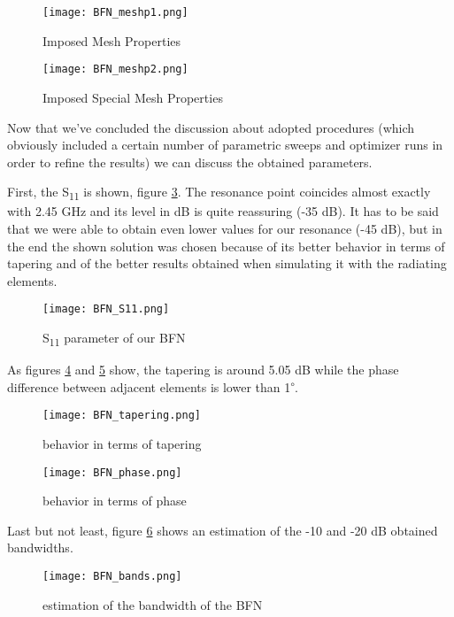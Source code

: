 \begin{figure}[H]
\centering
\texttt{[image: BFN\_meshp1.png]}
\caption{Imposed Mesh Properties}
\label{BFN_meshp1}
\end{figure}

\begin{figure}[H]
\centering
\texttt{[image: BFN\_meshp2.png]}
\caption{Imposed Special Mesh Properties}
\label{BFN_meshp2}
\end{figure}

\par\medskip
\noindent
Now that we've concluded the discussion about adopted procedures (which obviously included a certain number of parametric sweeps and optimizer runs in order to refine the results) we can discuss the obtained parameters.

\par\medskip
\noindent
First, the S\textsubscript{11} is shown, figure \ref{BFN_S11}. The resonance point coincides almost exactly with 2.45 GHz and its level in dB is quite reassuring (-35 dB). It has to be said that we were able to obtain even lower values for our resonance (-45 dB), but in the end the shown solution was chosen because of its better behavior in terms of tapering and of the better results obtained when simulating it with the radiating elements.

\begin{figure}[H]
\centering
\texttt{[image: BFN\_S11.png]}
\caption{S\textsubscript{11} parameter of our BFN}
\label{BFN_S11}
\end{figure}

\par\medskip
\noindent
As figures \ref{BFN_tapering} and \ref{BFN_phase} show, the tapering is around 5.05 dB while the phase difference between adjacent elements is lower than 1\textsuperscript{$\circ$}.

\begin{figure}[H]
\centering
\texttt{[image: BFN\_tapering.png]}
\caption{behavior in terms of tapering}
\label{BFN_tapering}
\end{figure}

\begin{figure}[H]
\centering
\texttt{[image: BFN\_phase.png]}
\caption{behavior in terms of phase}
\label{BFN_phase}
\end{figure}

\par\medskip
\noindent
Last but not least, figure \ref{BFN_bands} shows an estimation of the -10 and -20 dB obtained bandwidths.

\begin{figure}[H]
\centering
\texttt{[image: BFN\_bands.png]}
\caption{estimation of the bandwidth of the BFN}
\label{BFN_bands}
\end{figure}
